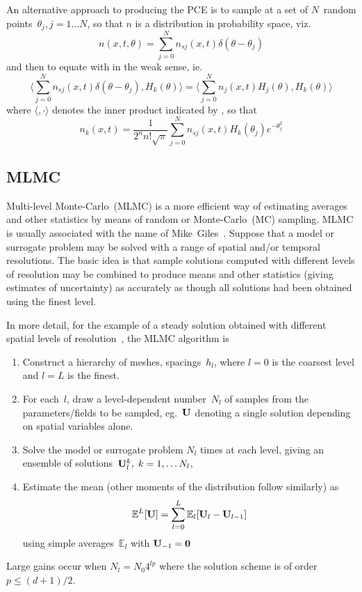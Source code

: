 An alternative approach to producing the PCE is to sample at a set of $N$~random
points~$\theta_j, j=1\ldots N$, so that
$n$ is a distribution in probability space, viz.
\begin{equation} \label{eq:dfnexpn}
n(x,t,\theta) = \sum_{j=0}^{N} n_{sj}(x,t)\delta(\theta-\theta_j)
\end{equation}
and then to equate with  in the weak sense, ie.
\begin{equation} \label{eq:hermweak}
\langle\sum_{j=0}^{N} n_{sj}(x,t)\delta(\theta-\theta_j), H_k(\theta)\rangle = 
\langle\sum_{j=0}^{N} n_{j}(x,t) H_j (\theta), H_k(\theta)\rangle 
\end{equation}
where $\langle,\cdot \rangle$ denotes the inner product indicated by \Eq{}, so that
\begin{equation} \label{eq:hermres}
n_k(x,t) = \frac{1}{2^nn!\sqrt{\pi}}\sum_{j=0}^{N} n_{sj}(x,t)H_k(\theta_j) e^{-\theta_j^2}
\end{equation}

\subsection{MLMC}\label{sec:mlmc}
Multi-level Monte-Carlo~(MLMC) is a more efficient way of estimating averages
and other statistics by means of random or Monte-Carlo~(MC) sampling. 
MLMC is usually associated with the name of Mike~Giles~\cite{Gi16Mult}.
Suppose that a model or surrogate problem may be solved with a range of
spatial and/or temporal resolutions. The basic idea is that sample solutions
computed with different levels of resolution may be combined to produce means
and other statistics 
(giving estimates of uncertainty) as accurately as though all solutions had been
obtained using the finest level.

In more detail, for the example of a steady solution obtained with
different spatial levels of resolution~\cite{Mi13Mult}, the MLMC algorithm is
\begin{enumerate}
\item Construct a hierarchy of meshes, spacings~$h_l$, where $l=0$ is the coarsest level
and $l=L$ is the finest.
\item For each~$l$, draw a level-dependent number~$N_l$ of samples from the parameters/fields
to be sampled, eg.\ 
${\bf U}$ denoting a single solution depending on spatial variables alone.
\item Solve the model or surrogate problem $N_l$ times at each level, giving an
ensemble of solutions~${\bf U}^k_l,\;k=1,\ldots N_l$,
\item Estimate the mean (other moments of the distribution follow similarly) as
\begin{equation}
{\mathbb E}^L[{\bf U}]= \sum_{l=0}^L {\mathbb E}_l[{\bf U}_l-{\bf U}_{l-1}]
\end{equation}
using simple averages~${\mathbb E}_l$ with ${\bf U}_{-1}={\bf 0}$
\end{enumerate}
Large gains occur when
$N_l=N_0 4^{lp}$ where the solution scheme is of order~$p\leq(d+1)/2$.

